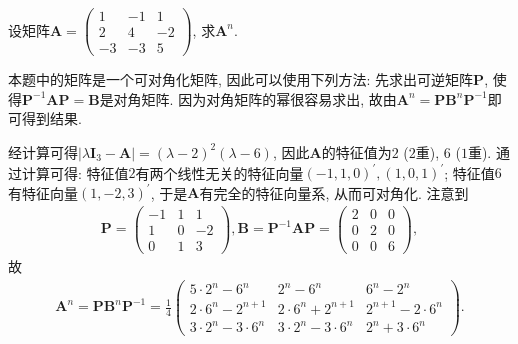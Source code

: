 \documentclass[../../main.tex]{subfiles}
\begin{document}
\begin{example}
设矩阵\(\boldsymbol{A}=\begin{pmatrix}
1&-1&1\\
2&4&-2\\
-3&-3&5
\end{pmatrix}\), 求\(\boldsymbol{A}^{n}\).
\end{example}
\begin{note}
本题中的矩阵是一个可对角化矩阵, 因此可以使用下列方法: 先求出可逆矩阵\(\boldsymbol{P}\), 使得\(\boldsymbol{P}^{-1}\boldsymbol{AP}=\boldsymbol{B}\)是对角矩阵. 因为对角矩阵的幂很容易求出, 故由\(\boldsymbol{A}^{n}=\boldsymbol{P}\boldsymbol{B}^{n}\boldsymbol{P}^{-1}\)即可得到结果.
\end{note}
\begin{solution}    
经计算可得\(\vert\lambda\boldsymbol{I}_{3}-\boldsymbol{A}\vert = (\lambda - 2)^{2}(\lambda - 6)\), 因此\(\boldsymbol{A}\)的特征值为\(2\) (\(2\)重), \(6\) (\(1\)重). 通过计算可得: 特征值\(2\)有两个线性无关的特征向量\((-1,1,0)^{\prime},(1,0,1)^{\prime}\); 特征值\(6\)有特征向量\((1,-2,3)^{\prime}\), 于是\(\boldsymbol{A}\)有完全的特征向量系, 从而可对角化. 注意到
\begin{align*}
\boldsymbol{P}=\begin{pmatrix}
-1&1&1\\
1&0&-2\\
0&1&3
\end{pmatrix}, \boldsymbol{B}=\boldsymbol{P}^{-1}\boldsymbol{AP}=\begin{pmatrix}
2&0&0\\
0&2&0\\
0&0&6
\end{pmatrix},
\end{align*}
故
\begin{align*}
\boldsymbol{A}^{n}=\boldsymbol{P}\boldsymbol{B}^{n}\boldsymbol{P}^{-1}=\frac{1}{4}\begin{pmatrix}
5\cdot 2^{n}-6^{n}&2^{n}-6^{n}&6^{n}-2^{n}\\
2\cdot 6^{n}-2^{n + 1}&2\cdot 6^{n}+2^{n + 1}&2^{n + 1}-2\cdot 6^{n}\\
3\cdot 2^{n}-3\cdot 6^{n}&3\cdot 2^{n}-3\cdot 6^{n}&2^{n}+3\cdot 6^{n}
\end{pmatrix}.
\end{align*} 

\end{solution}
\end{document}
